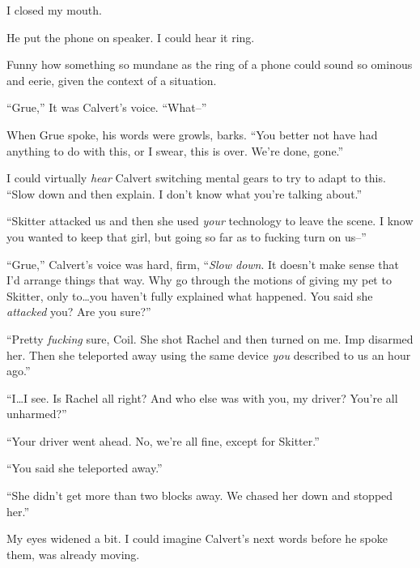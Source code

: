 I closed my mouth.



He put the phone on speaker.  I could hear it ring.



Funny how something so mundane as the ring of a phone could sound so ominous and eerie, given the context of a situation.



``Grue,'' It was Calvert's voice.  ``What--''



When Grue spoke, his words were growls, barks.  ``You better not have had anything to do with this, or I swear, this is over.  We're done, gone.''



I could virtually \emph{hear} Calvert switching mental gears to try to adapt to this.  ``Slow down and then explain.  I don't know what you're talking about.''



``Skitter attacked us and then she used \emph{your} technology to leave the scene.  I know you wanted to keep that girl, but going so far as to fucking turn on us--''



``Grue,'' Calvert's voice was hard, firm, ``\emph{Slow down}.  It doesn't make sense that I'd arrange things that way.  Why go through the motions of giving my pet to Skitter, only to\ldots you haven't fully explained what happened.  You said she \emph{attacked} you?  Are you sure?''



``Pretty \emph{fucking} sure, Coil.  She shot Rachel and then turned on me.  Imp disarmed her.  Then she teleported away using the same device \emph{you} described to us an hour ago.''



``I\ldots I see.  Is Rachel all right?  And who else was with you, my driver?  You're all unharmed?''



``Your driver went ahead.  No, we're all fine, except for Skitter.''



``You said she teleported away.''



``She didn't get more than two blocks away.  We chased her down and stopped her.''



My eyes widened a bit.  I could imagine Calvert's next words before he spoke them, was already moving.



